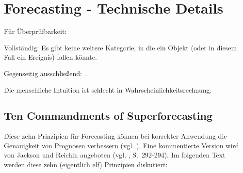 \chapter{Forecasting - Technische Details}

Für Überprüfbarkeit:

Vollständig: Es gibt keine weitere Kategorie, in die ein Objekt (oder in diesem
Fall ein Ereignis) fallen könnte.

Gegenseitig ausschließend: ...

Die menschliche Intuition ist schlecht in Wahrscheinlichkeitsrechnung.


\section{Ten Commandments of Superforecasting}

Diese zehn Prinzipien für Forecasting können bei korrekter Anwendung die Genauigkeit von
Prognosen verbessern (vgl. \cite{Ten_Comm}). Eine kommentierte Version wird von Jackson und Reichin
angeboten (vgl. \cite{Jackson}, S.~292-294). Im folgenden Text werden diese zehn (eigentlich elf)
Prinzipien diskutiert:

